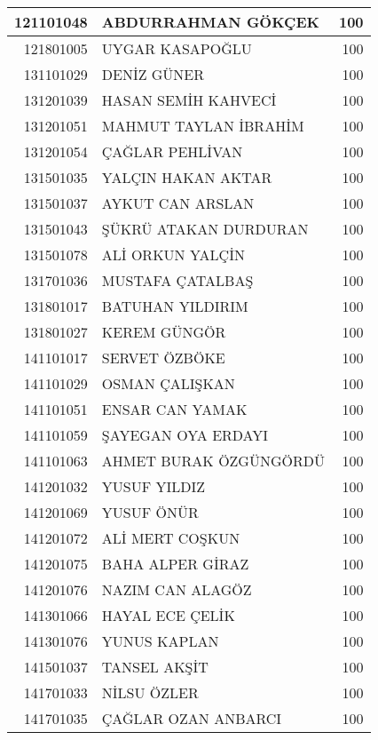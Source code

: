 \documentclass[12pt]{article}
\begin{document}
\begin{longtable}{||r||l||r||}
    \midrule
    121101048 & ABDURRAHMAN GÖKÇEK & 100 \\
    \midrule
    121801005 & UYGAR KASAPOĞLU & 100 \\
    \midrule
    131101029 & DENİZ GÜNER & 100 \\
    \midrule
    131201039 & HASAN SEMİH KAHVECİ & 100 \\
    \midrule
    131201051 & MAHMUT TAYLAN İBRAHİM & 100 \\
    \midrule
    131201054 & ÇAĞLAR PEHLİVAN & 100 \\
    \midrule
    131501035 & YALÇIN HAKAN AKTAR & 100 \\
    \midrule
    131501037 & AYKUT CAN ARSLAN & 100 \\
    \midrule
    131501043 & ŞÜKRÜ ATAKAN DURDURAN & 100 \\
    \midrule
    131501078 & ALİ ORKUN YALÇİN & 100 \\
    \midrule
    131701036 & MUSTAFA ÇATALBAŞ & 100 \\
    \midrule
    131801017 & BATUHAN YILDIRIM & 100 \\
    \midrule
    131801027 & KEREM GÜNGÖR & 100 \\
    \midrule
    141101017 & SERVET ÖZBÖKE & 100 \\
    \midrule
    141101029 & OSMAN ÇALIŞKAN & 100 \\
    \midrule
    141101051 & ENSAR CAN YAMAK & 100 \\
    \midrule
    141101059 & ŞAYEGAN OYA ERDAYI & 100 \\
    \midrule
    141101063 & AHMET BURAK ÖZGÜNGÖRDÜ & 100 \\
    \midrule
    141201032 & YUSUF YILDIZ & 100 \\
    \midrule
    141201069 & YUSUF ÖNÜR & 100 \\
    \midrule
    141201072 & ALİ MERT COŞKUN & 100 \\
    \midrule
    141201075 & BAHA ALPER GİRAZ & 100 \\
    \midrule
    141201076 & NAZIM CAN ALAGÖZ & 100 \\
    \midrule
    141301066 & HAYAL ECE ÇELİK & 100 \\
    \midrule
    141301076 & YUNUS KAPLAN & 100 \\
    \midrule
    141501037 & TANSEL AKŞİT & 100 \\
    \midrule
    141701033 & NİLSU ÖZLER & 100 \\
    \midrule
    141701035 & ÇAĞLAR OZAN ANBARCI & 100 \\

\end{longtable}
\end{document}
